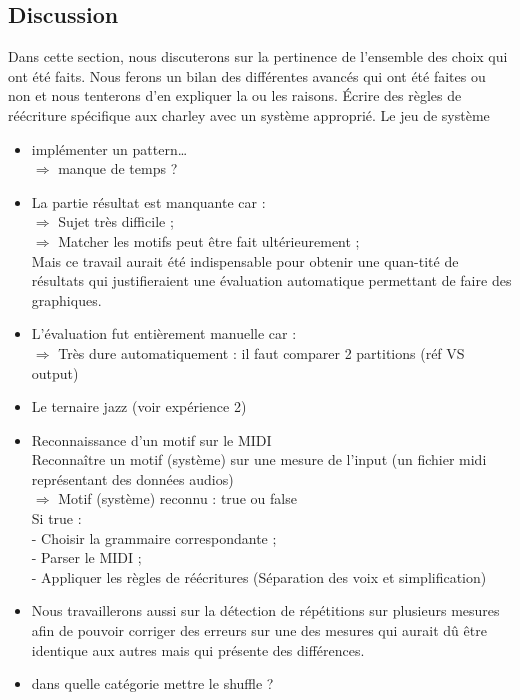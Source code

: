 \subsection*{Discussion}
Dans cette section, nous discuterons sur la pertinence de l’ensemble des choix qui ont été faits. Nous ferons un bilan des différentes avancés qui ont été faites ou non et nous tenterons d’en expliquer la ou les raisons.
Écrire des règles de réécriture spécifique aux charley avec un système approprié.
Le jeu de système
\begin{itemize}
	\item implémenter un pattern…\\
	$\Rightarrow$ manque de temps ?\\
	\item La partie résultat est manquante car :\\
	$\Rightarrow$ Sujet très difficile ;\\
	$\Rightarrow$ Matcher les motifs peut être fait ultérieurement ;\\
	\tab Mais ce travail aurait été indispensable pour obtenir une quan-\tab tité de résultats qui justifieraient une évaluation automatique \tab permettant de faire des graphiques.\\
	\item L’évaluation fut entièrement manuelle car :\\
	$\Rightarrow$ Très dure automatiquement : il faut comparer 2 partitions (réf \tab VS output)
\end{itemize}
\begin{itemize}
	\item Le ternaire jazz (voir expérience 2)
	\item Reconnaissance d’un motif sur le MIDI\\
	Reconnaître un motif (système) sur une mesure de l’input (un fichier midi représentant des données audios)\\
	$\Rightarrow$ Motif (système) reconnu : true ou false\\
	Si true :\\
	- Choisir la grammaire correspondante ;\\
	- Parser le MIDI ;\\
	- Appliquer les règles de réécritures (Séparation des voix et simplification)
	\item Nous travaillerons aussi sur la détection de répétitions sur plusieurs mesures afin de pouvoir corriger des erreurs sur une des mesures qui aurait dû être identique aux autres mais qui présente des différences.
	\item dans quelle catégorie mettre le shuffle ?
\end{itemize}
